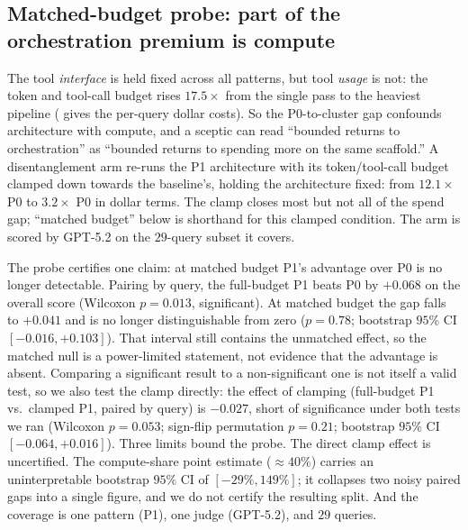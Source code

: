 \documentclass[11pt]{article}
\begin{document}
\subsection{Matched-budget probe: part of the orchestration premium is compute}\label{sec:disentangle}
The tool \emph{interface} is held fixed across all patterns, but tool \emph{usage} is
not: the token and tool-call budget rises $17.5\times$ from the single pass to the
heaviest pipeline ( gives the per-query dollar costs). So the
P0-to-cluster gap confounds architecture with compute, and a sceptic can read ``bounded
returns to orchestration'' as ``bounded returns to spending more on the same scaffold.''
A disentanglement arm re-runs
the P1 architecture with its token/tool-call budget clamped down towards the baseline's,
holding the architecture fixed: from $12.1\times$ P0 to $3.2\times$ P0 in dollar terms.
The clamp closes most but not all of the spend gap;
``matched budget'' below is shorthand for this clamped condition. The arm is scored by
GPT-5.2 on the $29$-query subset it covers.

The probe certifies one claim: at matched budget P1's advantage over P0 is no longer
detectable. Pairing by query, the full-budget P1 beats P0 by $+0.068$ on the overall
score (Wilcoxon $p{=}0.013$, significant). At matched budget the gap falls to $+0.041$
and is no longer distinguishable from zero ($p{=}0.78$; bootstrap $95\%$ CI $[-0.016,
+0.103]$). That interval still contains the unmatched effect, so the matched null is a
power-limited statement, not evidence that the advantage is absent. Comparing a
significant result to a non-significant one is not itself a valid test, so we also test
the clamp directly: the effect of clamping (full-budget P1 vs.\ clamped P1, paired by query) is $-0.027$, short
of significance under both tests we ran (Wilcoxon $p{=}0.053$; sign-flip permutation
$p{=}0.21$; bootstrap $95\%$ CI $[-0.064, +0.016]$). Three limits bound the
probe. The direct clamp effect is uncertified. The compute-share point
estimate ($\approx\!40\%$) carries an uninterpretable bootstrap $95\%$ CI of $[-29\%,
149\%]$; it collapses two noisy paired gaps into a single figure, and we do not certify
the resulting split. And the coverage is one pattern (P1), one judge (GPT-5.2), and $29$
queries.
\end{document}
